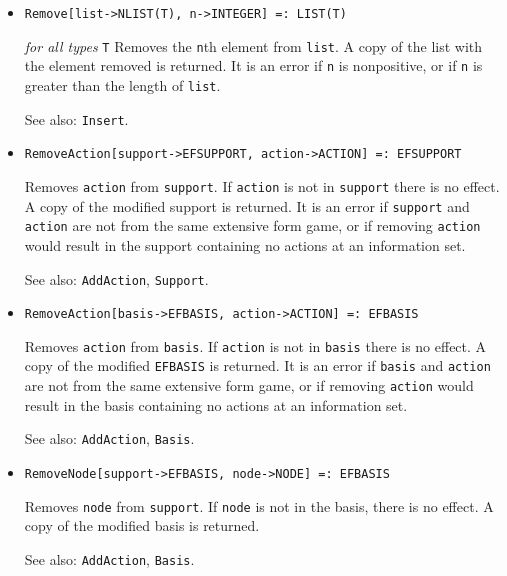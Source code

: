 \begin{itemize}
\item{}
\protect \large \begin{verbatim}
Remove[list->NLIST(T), n->INTEGER] =: LIST(T) 
\end{verbatim}\normalsize

{\it for all types} {\tt T}
\bd
Removes the \verb+n+th element from \verb+list+.  A copy of the list
with the element removed is returned.  It is an error if \verb+n+
is nonpositive, or if \verb+n+ is greater than the length of \verb+list+.
\item [See also:] \verb+Insert+.
\ed

\item{}
\protect \large \begin{verbatim}
RemoveAction[support->EFSUPPORT, action->ACTION] =: EFSUPPORT 
\end{verbatim}\normalsize
\bd
Removes \verb+action+ from \verb+support+.  If
\verb+action+ is not in \verb+support+ there is no
effect.  A copy of the modified support is returned.  It is an error
if \verb+support+ and \verb+action+ are not from the same extensive
form game, or if removing \verb+action+ would result in the support
containing no actions at an information set.
\item [See also:] \verb+AddAction+, \verb+Support+.
\ed

\item{}
\protect \large \begin{verbatim}
RemoveAction[basis->EFBASIS, action->ACTION] =: EFBASIS 
\end{verbatim}\normalsize
\bd
Removes \verb+action+ from \verb+basis+.  If
\verb+action+ is not in \verb+basis+ there is no
effect.  A copy of the modified \verb+EFBASIS+ is returned.  It is an error
if \verb+basis+ and \verb+action+ are not from the same extensive
form game, or if removing \verb+action+ would result in the basis
containing no actions at an information set.
\item [See also:] \verb+AddAction+, \verb+Basis+.
\ed

\item{}
\protect \large \begin{verbatim}
RemoveNode[support->EFBASIS, node->NODE] =: EFBASIS 
\end{verbatim}\normalsize

\bd
Removes \verb+node+ from \verb+support+.  If \verb+node+ is not in
the basis, there is no effect.  A copy of the modified basis is
returned.  
\item [See also:] \verb+AddAction+, \verb+Basis+.
\ed


\end{itemize}
